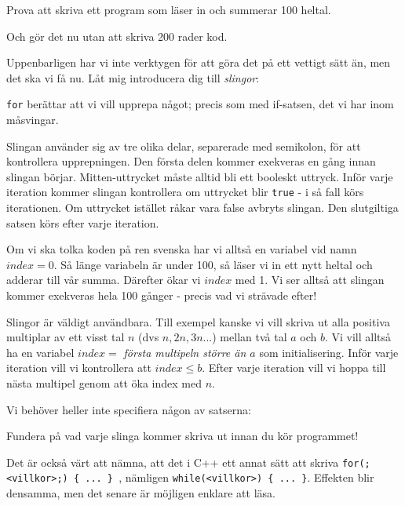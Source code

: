 Prova att skriva ett program som läser in och summerar 100 heltal.

Och gör det nu utan att skriva 200 rader kod.

Uppenbarligen har vi inte verktygen för att göra det på ett vettigt sätt än, men det ska vi få nu. Låt mig introducera dig till \emph{slingor}:



\texttt{for} berättar att vi vill upprepa något; precis som med if-satsen, det vi har inom måsvingar. 

Slingan använder sig av tre olika delar, separerade med semikolon, för att kontrollera upprepningen. Den första delen kommer exekveras en gång innan slingan börjar. Mitten-uttrycket måste alltid bli ett booleskt uttryck. Inför varje iteration kommer slingan kontrollera om uttrycket blir \texttt{true} - i så fall körs iterationen. Om uttrycket istället råkar vara false avbryts slingan. Den slutgiltiga satsen körs efter varje iteration.

Om vi ska tolka koden på ren svenska har vi alltså en variabel vid namn $index = 0$. Så länge variabeln är under 100, så läser vi in ett nytt heltal och adderar till vår summa. Därefter ökar vi $index$ med 1. Vi ser alltså att slingan kommer exekveras hela 100 gånger - precis vad vi strävade efter!

Slingor är väldigt användbara. Till exempel kanske vi vill skriva ut alla positiva multiplar av ett visst tal $n$ (dvs $n, 2n, 3n...$) mellan två tal $a$ och $b$. Vi vill alltså ha en variabel $index = $ \emph{första multipeln större än $a$} som initialisering. Inför varje iteration vill vi kontrollera att $index \le b$. Efter varje iteration vill vi hoppa till nästa multipel genom att öka index med $n$.



Vi behöver heller inte specifiera någon av satserna:



Fundera på vad varje slinga kommer skriva ut innan du kör programmet!

Det är också värt att nämna, att det i C++ ett annat sätt att skriva \texttt{for(;<villkor>;) \{ ... \} }, nämligen \texttt{while(<villkor>) \{ ... \}}. Effekten blir densamma, men det senare är möjligen enklare att läsa.